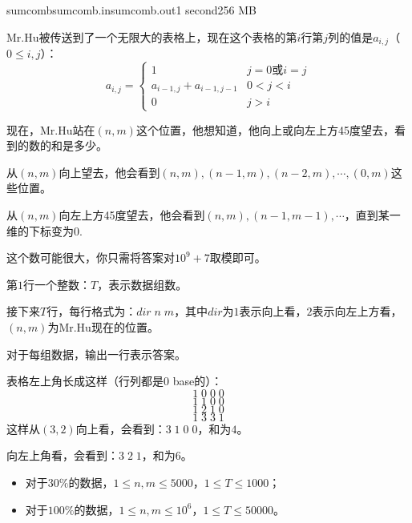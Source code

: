 \documentclass[11pt,a4paper,oneside]{article}
\begin{document}
\begin{problem}{sumcomb}{sumcomb.in}{sumcomb.out}{1 second}{256 MB}
	
	Mr.Hu被传送到了一个无限大的表格上，现在这个表格的第$i$行第$j$列的值是$a_{i,j}$（$0 \leq i, j$）：
	$$
		a_{i,j} = 
		\begin{cases}
			1 & j = 0 \text{或} i = j \\
			a_{i-1,j} + a_{i-1,j-1} & 0 < j < i \\
			0 & j > i
		\end{cases}
	$$
	
	现在，Mr.Hu站在$(n,m)$这个位置，他想知道，他向上或向左上方45度望去，看到的数的和是多少。
	
	从$(n,m)$向上望去，他会看到$(n,m),(n-1,m),(n-2,m),\cdots,(0,m)$这些位置。
	
	从$(n,m)$向左上方45度望去，他会看到$(n,m),(n-1,m-1),\cdots$，直到某一维的下标变为0.
	
	这个数可能很大，你只需将答案对$10^9 + 7$取模即可。
	
	\InputFile
	
	第$1$行一个整数：$T$，表示数据组数。
	
	接下来$T$行，每行格式为：$dir \; n \; m$，其中$dir$为$1$表示向上看，$2$表示向左上方看，$(n,m)$为Mr.Hu现在的位置。
	
	\OutputFile
	
	对于每组数据，输出一行表示答案。
	
	\Example
	
	\begin{example}
	\end{example}
	
	表格左上角长成这样（行列都是0 base的）：
	$$
		1 \; 0 \; 0 \; 0
	$$
	$$
		1 \; 1 \; 0 \; 0
	$$
	$$
		1 \; 2 \; 1 \; 0
	$$
	$$
		1 \; 3 \; 3 \; 1
	$$
	这样从$(3,2)$向上看，会看到：$3 \; 1 \; 0 \; 0$，和为$4$。
	
	向左上角看，会看到：$3 \; 2 \; 1$，和为$6$。
	
	\Note

	\begin{itemize}
		\item 对于$30\%$的数据，$1 \leq n, m \leq 5000$，$1 \leq T \leq 1000$；
		\item 对于$100\%$的数据，$1 \leq n, m \leq 10^6$，$1 \leq T \leq 50000$。
	\end{itemize}

\end{problem}
\end{document}
